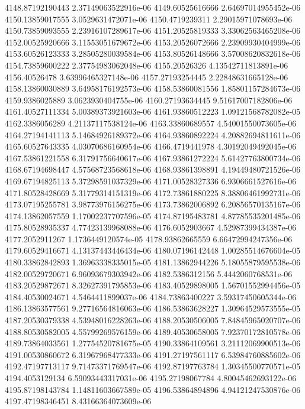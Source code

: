 {4148.87192190443 2.37149063522916e-06
4149.60525616666 2.64697014955452e-06
4150.13859017555 3.0529631472071e-06
4150.4719239311 2.29015971078693e-06
4150.73859093555 2.23916107289617e-06
4151.20525819333 3.33062563465208e-06
4152.00525920666 3.11553051679672e-06
4153.20526072666 2.23909930404999e-06
4153.60526123333 3.28505280039584e-06
4153.80526148666 3.57008620832618e-06
4154.73859600222 2.37754983062048e-06
4155.20526326 4.13542711813891e-06
4156.40526478 3.63996465327148e-06
4157.27193254445 2.22848631665128e-06
4158.13860030889 3.64958176192573e-06
4158.53860081556 1.85801157284673e-06
4159.9386025889 3.0623930404755e-06
4160.27193634445 9.51617007182806e-06
4161.40527111334 5.00389373921603e-06
4161.93860512223 1.09121568782082e-05
4162.3386056289 4.21137117538124e-06
4163.33860689557 4.54001550073605e-06
4164.27194141113 5.14684926189372e-06
4164.93860892224 4.20882694811611e-06
4165.60527643335 4.03070686160954e-06
4166.4719441978 4.30192049492045e-06
4167.53861221558 6.31791756640617e-06
4167.93861272224 5.61427763800734e-06
4168.67194698447 4.57568723568618e-06
4168.93861398891 4.19449480721526e-06
4169.67194825113 5.37298591037329e-06
4171.00528327336 6.9306661527616e-06
4171.80528428669 5.31779314151319e-06
4172.73861880225 8.38806461992731e-06
4173.07195255781 3.98773976156275e-06
4173.73862006892 6.20856570135167e-06
4174.13862057559 1.17002237707596e-05
4174.87195483781 4.87785535201485e-06
4175.80528935337 4.77423139968088e-06
4176.6052903667 4.52987399434387e-06
4177.2052911267 1.1736449120574e-05
4178.93862665559 6.66472994247356e-06
4179.60529416671 4.13137443446434e-06
4180.07196142448 1.00285514676604e-05
4180.33862842893 1.36963338335015e-05
4181.13862944226 5.18055879595538e-06
4182.00529720671 6.96093679303942e-06
4182.5386312156 5.4442060768531e-06
4183.20529872671 8.32627391795853e-06
4183.40529898005 1.56701552994456e-05
4184.40530024671 4.5464411899037e-06
4184.73863400227 3.59317450605344e-06
4186.13863577561 9.27716564816063e-06
4186.53863628227 1.30964529573555e-05
4187.20530379338 4.53948016228263e-06
4188.20530506005 7.84845965020707e-06
4188.80530582005 4.55799269576159e-06
4189.40530658005 7.92370172810578e-06
4189.73864033561 1.27754520781675e-05
4190.33864109561 3.21112069900513e-06
4191.00530860672 6.31967968477333e-06
4191.27197561117 6.53984760885602e-06
4192.47197713117 9.71473371769547e-06
4192.87197763784 1.30345500770571e-05
4194.4053129134 6.59093443317031e-06
4195.27198067784 4.80045462693122e-06
4195.87198143784 1.14811603667589e-05
4196.53864894896 4.94121247530876e-06
4197.47198346451 8.43166364073609e-06
}
